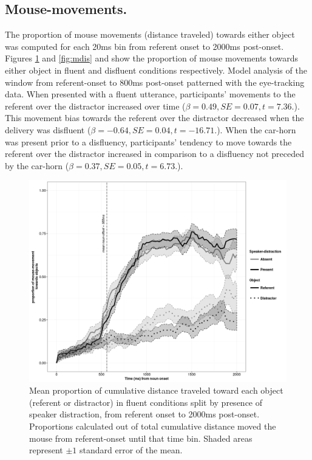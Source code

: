 \documentclass[a4paper,man,natbib]{apa6}
\begin{document}
\subsection{Mouse-movements.}
The proportion of mouse movements (distance traveled) towards either object was computed for each 20ms bin from referent onset to 2000ms post-onset. 
Figures \ref{fig:mflu} and \ref{fig:mdis} and show the proportion of mouse movements towards either object in fluent and disfluent conditions respectively. 
Model analysis of the window from referent-onset to 800ms post-onset patterned with the eye-tracking data. 
When presented with a fluent utterance, participants' movements to the referent over the distractor increased over time ($\beta = 0.49, SE = 0.07, t=7.36.$). 
This movement bias towards the referent over the distractor decreased when the delivery was disfluent ($\beta = -0.64, SE = 0.04, t=-16.71.$). 
When the car-horn was present prior to a disfluency, participants' tendency to move towards the referent over the distractor increased in comparison to a disfluency not preceded by the car-horn ($\beta = 0.37, SE = 0.05, t=6.73.$).


\begin{figure}[Ht]
  \centering
	\includegraphics[scale=.5]{mflu.png}
  \caption{Mean proportion of cumulative distance traveled toward each object (referent or distractor) in fluent conditions split by presence of speaker distraction, from referent onset to 2000ms post-onset. Proportions calculated out of total cumulative distance moved the mouse from referent-onset until that time bin. Shaded areas represent $\pm 1$ standard error of the mean.}
  \label{fig:mflu}
\end{figure}
\end{document}
